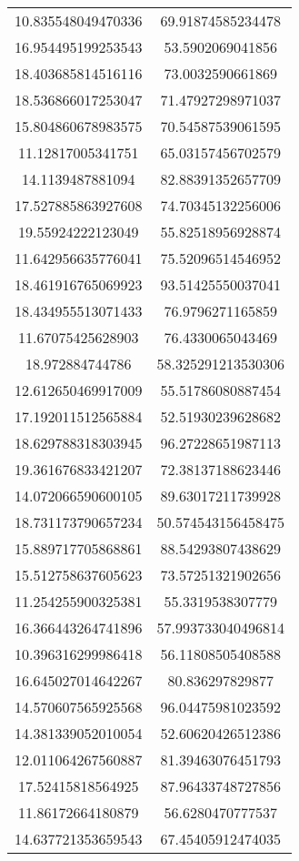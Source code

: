 \begin{table}
\begin{tabular}{cc}
10.835548049470336 & 69.91874585234478 \\
16.954495199253543 & 53.5902069041856 \\
18.403685814516116 & 73.0032590661869 \\
18.536866017253047 & 71.47927298971037 \\
15.804860678983575 & 70.54587539061595 \\
11.12817005341751 & 65.03157456702579 \\
14.1139487881094 & 82.88391352657709 \\
17.527885863927608 & 74.70345132256006 \\
19.55924222123049 & 55.82518956928874 \\
11.642956635776041 & 75.52096514546952 \\
18.461916765069923 & 93.51425550037041 \\
18.434955513071433 & 76.9796271165859 \\
11.67075425628903 & 76.4330065043469 \\
18.972884744786 & 58.325291213530306 \\
12.612650469917009 & 55.51786080887454 \\
17.192011512565884 & 52.51930239628682 \\
18.629788318303945 & 96.27228651987113 \\
19.361676833421207 & 72.38137188623446 \\
14.072066590600105 & 89.63017211739928 \\
18.731173790657234 & 50.574543156458475 \\
15.889717705868861 & 88.54293807438629 \\
15.512758637605623 & 73.57251321902656 \\
11.254255900325381 & 55.3319538307779 \\
16.366443264741896 & 57.993733040496814 \\
10.396316299986418 & 56.11808505408588 \\
16.645027014642267 & 80.836297829877 \\
14.570607565925568 & 96.04475981023592 \\
14.381339052010054 & 52.60620426512386 \\
12.011064267560887 & 81.39463076451793 \\
17.52415818564925 & 87.96433748727856 \\
11.86172664180879 & 56.6280470777537 \\
14.637721353659543 & 67.45405912474035 \\

\end{tabular}
\end{table}
